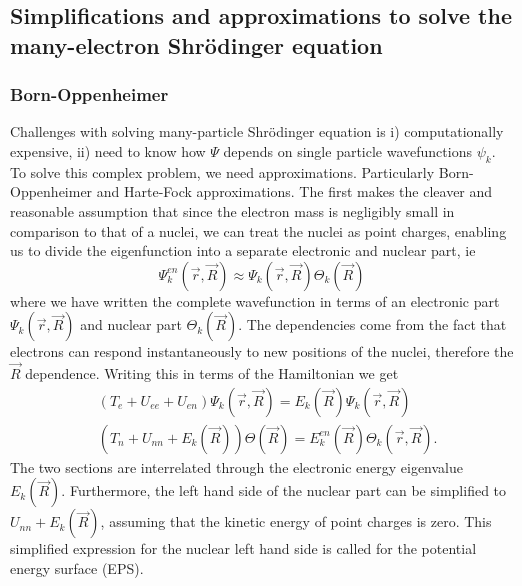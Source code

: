 \subsection{Simplifications and approximations to solve the many-electron Shr\"{o}dinger equation}

\subsubsection{Born-Oppenheimer}
Challenges with solving many-particle Shr\"{o}dinger equation is i) computationally expensive, ii) need to know how $\Psi$ depends on single particle wavefunctions $\psi_k$. To solve this complex problem, we need approximations. Particularly Born-Oppenheimer and Harte-Fock approximations. The first makes the cleaver and reasonable assumption that since the electron mass is negligibly small in comparison to that of a nuclei, we can treat the nuclei as point charges, enabling us to divide the eigenfunction into a separate electronic and nuclear part, ie
\begin{equation}
    \Psi_{k}^{en}(\vec{r}, \vec{R}) \approx \Psi_k(\vec{r}, \vec{R}) \Theta_k(\vec{R})
\end{equation}
where we have written the complete wavefunction in terms of an electronic part $\Psi_k(\vec{r}, \vec{R})$ and nuclear part $\Theta_k(\vec{R})$. The dependencies come from the fact that electrons can respond instantaneously to new positions of the nuclei, therefore the $\vec{R}$ dependence. Writing this in terms of the Hamiltonian we get
\begin{align}
    &\left( T_{e} + U_{ee} + U_{en} \right) \Psi_k(\vec{r}, \vec{R}) = E_k(\vec{R})\Psi_k(\vec{r}, \vec{R}) \\
    &\left( T_{n} + U_{nn} + E_k(\vec{R}) \right) \Theta(\vec{R}) = E_{k}^{en}(\vec{R})\Theta_k(\vec{r}, \vec{R}).
\end{align}
The two sections are interrelated through the electronic energy eigenvalue $E_k(\vec{R})$. Furthermore, the left hand side of the nuclear part can be simplified to $U_{nn} + E_k(\vec{R})$, assuming that the kinetic energy of point charges is zero. This simplified expression for the nuclear left hand side is called for the potential energy surface (EPS).

